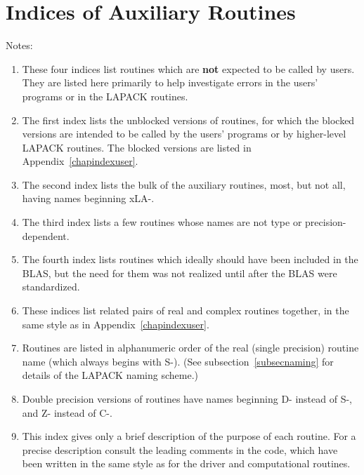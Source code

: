 \chapter{Indices of Auxiliary Routines}\label{chapindexauxil}

Notes:

\begin{enumerate}

\item These four indices list routines which are {\bf not} expected to be called by users.
They are listed here primarily to help investigate errors in the users' programs or in the LAPACK routines.

\item The first index lists the unblocked versions of routines, for which the blocked versions
are intended to be called by the users' programs or by higher-level LAPACK routines. The blocked
versions are listed in Appendix~\ref{chapindexuser}.

\item The second index lists the bulk of the auxiliary routines, most, but not all, having names
 beginning xLA-.

\item The third index lists a few routines whose names are not type or precision-dependent.

\item The fourth index lists routines which ideally should have been included in the BLAS,
but the need for them was not realized until after the BLAS were standardized.

\item These indices 
list related pairs of real and complex routines together,
in the same style as in Appendix~\ref{chapindexuser}.

\item Routines are listed in alphanumeric order
of the real (single precision) routine name (which always begins with S-).
(See subsection~\ref{subsecnaming} for details of the LAPACK naming scheme.)

\item Double precision versions of routines have names beginning
D- instead of S-, and Z- instead of C-.

\item This index gives only a brief description of the purpose of each
routine. For a precise description consult the leading comments in the code,
which have been written in the same style as for the driver and
computational routines.

\end{enumerate}

